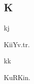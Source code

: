 \begin{multicols*}{2}
\section*{K}

\begin{dictroot}{k}{j}
    \begin{dictentry}{KiiY}{v.tr.}
    \end{dictentry}
\end{dictroot}

\begin{dictroot}{k}{k}
    \begin{dictentry}{KuRKi}{n.}
    \end{dictentry}
\end{dictroot}


\end{multicols*}
